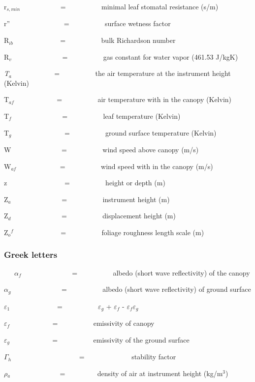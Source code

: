 r\(_{s,min}\)~~~~~~~~~~~ = ~~~~~~~~~ minimal leaf stomatal resistance (s/m)

r''~~~~~~~~~~~~~~~ = ~~~~~~~~~ surface wetness factor

R\(_{ib}\)~~~~~~~~~~~~~ = ~~~~~~~~~ bulk Richardson number

R\(_{v}\)~~~~~~~~~~~~~~ = ~~~~~~~~~ gas constant for water vapor (461.53 J/kgK)

\emph{T\(_{a}\)} ~~~~~~~~~~~ = ~~~~~~~~~ the air temperature at the instrument height (Kelvin)

T\(_{af}\) ~~~~~~~~~~~ = ~~~~~~~~~ air temperature with in the canopy (Kelvin)

T\emph{\(_{f}\)}~~~~~~~~~~~~~~ = ~~~~~~~~~ leaf temperature (Kelvin)

T\(_{g}\) ~~~~~~~~~~~~~~ = ~~~~~~~~~ ground surface temperature (Kelvin)

W~~~~~~~~~~~~~~ = ~~~~~~~~~ wind speed above canopy (m/s)

W\(_{af}\)~~~~~~~~~~~~ = ~~~~~~~~~ wind speed with in the canopy (m/s)

z~~~~~~~~~~~~~~~~ = ~~~~~~~~~ height or depth (m)

Z\(_{a}\)~~~~~~~~~~~~~~ = ~~~~~~~~~ instrument height (m)

Z\(_{d}\)~~~~~~~~~~~~~~ = ~~~~~~~~~ displacement height (m)

Z\(_{o}\)\(^{f}\)~~~~~~~~~~~~~ = ~~~~~~~~~ foliage roughness length scale (m)

\subsubsection{Greek letters}\label{greek-letters-000}

~~~\(\alpha\)\(_{f}\)~~~~~~~~~~~~~~ = ~~~~~~~~~ albedo (short wave reflectivity) of the canopy

\(\alpha\)\(_{g}\)~~~~~~~~~~~~~~ = ~~~~~~~~~ albedo (short wave reflectivity) of ground surface

\(\varepsilon\)\(_{1}\)~~~~~~~~~~~~~ = ~~~~~~~~~ \(\varepsilon\)\(_{g}\) + \(\varepsilon\)\(_{f}\)  - \(\varepsilon\)\(_{f}\)\(\varepsilon\)\(_{g}\)

\(\varepsilon\)\(_{f}\) ~~~~~~~~~~~ = ~~~~~~~~~ emissivity of canopy 

\(\varepsilon\)\(_{g}\) ~~~~~~~~~~~ = ~~~~~~~~~ emissivity of the ground surface

\(\Gamma\)\(_{h}\)~~~~~~~~~~~~~~~~~~~ = ~~~~~~~~~~~~~stability factor

\(\rho\)\(_{a}\)~ ~~~~~~~~~~~~ = ~~~~~~~~ density of air at instrument height (kg/m\(^{3}\))

